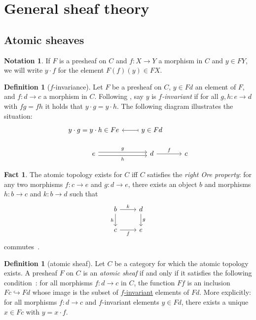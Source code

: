 \documentclass[
  sigconf,
  screen, ]{acmart}
\theoremstyle{definition}
\newtheorem{definition}[theorem]{Definition}
\newtheorem{notation}[theorem]{Notation}
\newtheorem{fact}[theorem]{Fact}
\newcommand\commsquare[8]{
\begin{tikzcd}[ampersand replacement=\&]
{#1} \arrow[d, "{#4}"'] \arrow[r, "{#2}"] \& {#3} \arrow[d, "{#5}"] \\
{#6} \arrow[r, "{#7}"']                \& {#8}
\end{tikzcd}
}
\newcommand\nref[2]{\hyperref[#1]{#2}} \newcommand\checkhigh{{\huge{\color{red}\textbf{TODO: check}}}}
\begin{document}
\section{General sheaf theory} \label{app:sec:sheaf-theory}

\subsection{Atomic sheaves} \label{app:sec:atomic-sheaves}

\begin{notation} \label{app:notation:psh-action}
  If $F$ is a presheaf
  on $C$ and $f:X\to Y$ a morphism in $C$
  and $y\in FY$,
  we will write $y\cdot f$ for the element $F(f)(y)\in FX$.
\end{notation}

\begin{definition}[$f$-invariance] \label{app:def:f-inv}
  Let $F$ be a presheaf on $C$,
  $y\in Fd$ an element of $F$,
  and $f : d\to c$ a morphism in $C$.
  Following \citet{simpson2017probability},
  say $y$ is \emph{$f$-invariant}
  if for all $g,h : e\to d$
  with $fg = fh$
  it holds that
  $y\cdot g = y\cdot h$.
  The following diagram illustrates the situation:
  \[ \begin{tikzcd}
  y\cdot g = y\cdot h \in Fe                                & y\in Fd \arrow[l, maps to] &   \\
  e \arrow[r, "h"', shift right] \arrow[r, "g", shift left] & d \arrow[r, "f"]           & c
  \end{tikzcd}\]
\end{definition}

\begin{fact} \label{app:fact:right-ore-atomic-topology}
  The atomic topology exists for $C$ iff $C$ satisfies the \emph{right Ore property}:
  for any two morphisms $f : c\to e$ and $g : d\to e$,
  there exists an object $b$ and morphisms $h : b\to c$
  and $k : b\to d$ such that
  \[ \commsquare{b}{k}{d}{h}{g}{c}{f}{e} \]
  commutes~\cite[Example III.2(f), p.115]{maclane2012sheaves}.
\end{fact}

\begin{definition}[atomic sheaf] \label{app:def:atomic-sheaf-condition}
  Let $C$ be a category for which the atomic topology exists.
  A presheaf $F$ on $C$ is an \emph{atomic sheaf}
  if and only if it satisfies
  the following condition~\cite[Lemma III.4.2]{maclane2012sheaves}:
  for all morphisms $f : d\to c$ in $C$,
  the function $Ff$ is an inclusion $Fc\hookrightarrow Fd$
  whose image is the subset of \nref{app:def:f-inv}{$f$-invariant} elements
  of $Fd$.
  More explicitly: for all morphisms
  $f : d\to c$ and $f$-invariant elements $y\in Fd$,
  there exists a unique $x\in Fc$
  with $y = x\cdot f$.
\end{definition}
\end{document}

